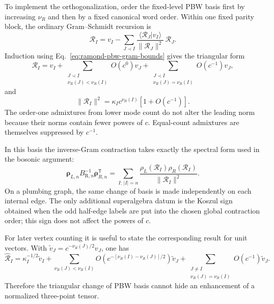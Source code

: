 \documentclass[11pt]{article}
\newcommand{\R}{\mathrm R}
\begin{document}
To implement the orthogonalization, order the fixed-level PBW basis first
by increasing \(\nu_R\) and then by a fixed canonical word order.  Within
one fixed parity block, the ordinary Gram--Schmidt recursion is
\begin{equation}
 \mathcal R_I
 =v_I-
 \sum_{J\prec I}
 \frac{\langle\mathcal R_J|v_I\rangle}
      {\|\mathcal R_J\|^2}\,\mathcal R_J.
 \label{eq:ramond-gram-schmidt-recursion}
\end{equation}
Induction using Eq.~\eqref{eq:ramond-pbw-gram-bounds} gives the triangular
form
\begin{equation}
 \boxed{
 \mathcal R_I
 =v_I
 +\sum_{\substack{J\prec I\\\nu_R(J)<\nu_R(I)}}
   O(c^0)v_J
 +\sum_{\substack{J\prec I\\\nu_R(J)=\nu_R(I)}}
   O(c^{-1})v_J,}
 \label{eq:ramond-gram-schmidt-triangular}
\end{equation}
and
\begin{equation}
 \boxed{
 \|\mathcal R_I\|^2
 =\kappa_Ic^{\nu_R(I)}
  \left[1+O(c^{-1})\right].}
 \label{eq:precontract-gram-power}
\end{equation}
The order-one admixtures from lower mode count do not alter the leading
norm because their norms contain fewer powers of \(c\).  Equal-count
admixtures are themselves suppressed by \(c^{-1}\).

In this basis the inverse-Gram contraction takes exactly the spectral form
used in the bosonic argument:
\begin{equation}
 \bm\rho_{L,n}B_{\R,n}^{-1}\bm\rho_{R,n}^{\mathsf T}
 =\sum_{I:\,|I|=n}
 \frac{\rho_L(\mathcal R_I)\rho_R(\mathcal R_I)}
      {\|\mathcal R_I\|^2}.
 \label{eq:ramond-orthogonal-spectral-sewing}
\end{equation}
On a plumbing graph, the same change of basis is made independently on
each internal edge.  The only additional superalgebra datum is the Koszul
sign obtained when the odd half-edge labels are put into the chosen global
contraction order; this sign does not affect the powers of \(c\).

For later vertex counting it is useful to state the corresponding result
for unit vectors.  With
\(\widetilde v_J=c^{-\nu_R(J)/2}v_J\), one has
\begin{equation}
 \widehat{\mathcal R}_I
 =\kappa_I^{-1/2}\widetilde v_I
 +\sum_{\nu_R(J)<\nu_R(I)}
  O\!\left(c^{-[\nu_R(I)-\nu_R(J)]/2}\right)\widetilde v_J
 +\sum_{\substack{J\ne I\\\nu_R(J)=\nu_R(I)}}
  O(c^{-1})\widetilde v_J.
 \label{eq:ramond-unit-gram-schmidt-state}
\end{equation}
Therefore the triangular change of PBW basis cannot hide an enhancement
of a normalized three-point tensor.
\end{document}
